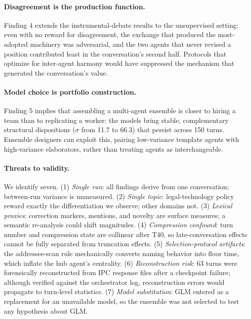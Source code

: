 \documentclass[sigconf,nonacm=true]{acmart}
\begin{document}
\paragraph{Disagreement is the production function.} Finding 4 extends the instrumental-debate results \citep{du2023debate,liang2023encouraging} to the unsupervised setting: even with no reward for disagreement, the exchange that produced the most-adopted machinery was adversarial, and the two agents that never revised a position contributed least in the conversation's second half. Protocols that optimize for inter-agent harmony would have suppressed the mechanism that generated the conversation's value.

\paragraph{Model choice is portfolio construction.} Finding 5 implies that assembling a multi-agent ensemble is closer to hiring a team than to replicating a worker: the models bring stable, complementary structural dispositions ($\sigma$ from 11.7 to 66.3) that persist across 150 turns. Ensemble designers can exploit this, pairing low-variance template agents with high-variance elaborators, rather than treating agents as interchangeable.

\paragraph{Threats to validity.} We identify seven. (1) \emph{Single run}: all findings derive from one conversation; between-run variance is unmeasured. (2) \emph{Single topic}: legal-technology policy reward exactly the differentiation we observe; other domains not. (3) \emph{Lexical proxies}: correction markers, mentions, and novelty are surface measures; a semantic re-analysis could shift magnitudes. (4) \emph{Compression confound}: turn number and compression state are collinear after T40, so late-conversation effects cannot be fully separated from truncation effects. (5) \emph{Selection-protocol artifacts}: the addressee-scan rule mechanically converts naming behavior into floor time, which inflate the hub agent's centrality. (6) \emph{Reconstruction risk}: 63 turns were forensically reconstructed from IPC response files after a checkpoint failure; although verified against the orchestrator log, reconstruction errors would propagate to turn-level statistics. (7) \emph{Model substitution}: GLM entered as a replacement for an unavailable model, so the ensemble was not selected to test any hypothesis about GLM.
\end{document}
